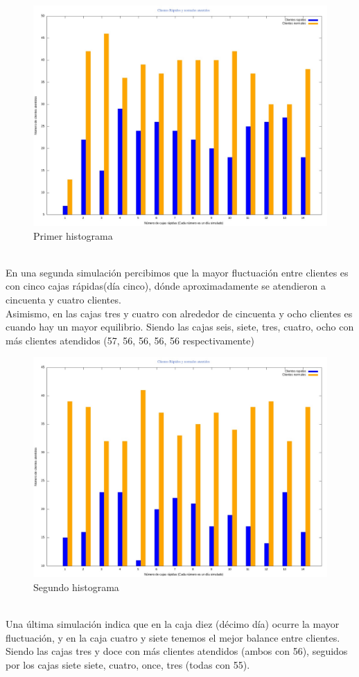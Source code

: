 \documentclass[letterpaper,11pt]{article}
\begin{document}
\begin{figure}[htb]
	\centering
	\includegraphics[scale=.20]{Barras1.jpeg}
	\caption{Primer histograma}
\end{figure}\\
En una segunda simulación percibimos que la mayor fluctuación entre clientes es con cinco cajas rápidas(día cinco), dónde aproximadamente se atendieron a cincuenta y cuatro clientes.\\ Asimismo, en las cajas tres y cuatro con alrededor de cincuenta y ocho clientes es cuando hay un mayor equilibrio. Siendo las cajas seis, siete, tres, cuatro, ocho con más clientes atendidos (57, 56, 56, 56, 56 respectivamente)
\begin{figure}[htb]
	\centering
	\includegraphics[scale=.20]{Barras2.jpeg}
	\caption{Segundo histograma}	
\end{figure}\\
Una última simulación indica que en la caja diez (décimo día) ocurre la mayor fluctuación, y en la caja cuatro y siete tenemos el mejor balance entre clientes.\\Siendo las cajas tres y doce con más clientes atendidos (ambos con 56), seguidos por los cajas siete siete, cuatro, once, tres (todas con 55).\\
\end{document}
